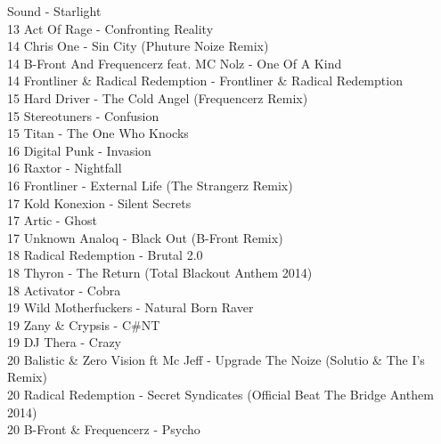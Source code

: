 \begin{multicols}{2}
Sound - Starlight\\ 13 Act Of Rage - Confronting Reality\\ 14 Chris One - Sin City (Phuture Noize Remix)\\ 14 B-Front And Frequencerz feat. MC Nolz - One Of A Kind\\ 14 Frontliner \& Radical Redemption - Frontliner \& Radical Redemption\\ 15 Hard Driver - The Cold Angel (Frequencerz Remix)\\ 15 Stereotuners - Confusion\\ 15 Titan - The One Who Knocks\\ 16 Digital Punk - Invasion\\ 16 Raxtor - Nightfall\\ 16 Frontliner - External Life (The Strangerz Remix)\\ 17 Kold Konexion - Silent Secrets\\ 17 Artic - Ghost\\ 17 Unknown Analoq - Black Out (B-Front Remix)\\ 18 Radical Redemption - Brutal 2.0\\ 18 Thyron - The Return (Total Blackout Anthem 2014)\\ 18 Activator - Cobra\\ 19 Wild Motherfuckers - Natural Born Raver\\ 19 Zany \& Crypsis - C\#NT\\ 19 DJ Thera - Crazy\\ 20 Balistic \& Zero Vision ft Mc Jeff - Upgrade The Noize (Solutio \& The I's Remix)\\ 20 Radical Redemption - Secret Syndicates (Official Beat The Bridge Anthem 2014)\\ 20 B-Front \& Frequencerz - Psycho\\

\end{multicols}
